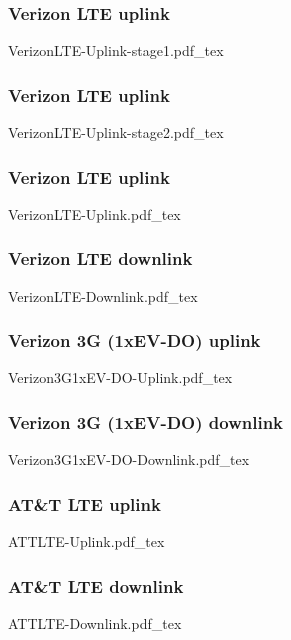\documentclass[svgnames]{beamer}
\begin{document}
\begin{frame}
\frametitle{Verizon LTE uplink}
\vspace{-1 cm}
\def\svgwidth{\columnwidth}\footnotesize{VerizonLTE-Uplink-stage1.pdf_tex}
\end{frame}

\begin{frame}
\frametitle{Verizon LTE uplink}
\vspace{-1 cm}
\def\svgwidth{\columnwidth}\footnotesize{VerizonLTE-Uplink-stage2.pdf_tex}
\end{frame}

\begin{frame}
\frametitle{Verizon LTE uplink}
\vspace{-1 cm}
\def\svgwidth{\columnwidth}\footnotesize{VerizonLTE-Uplink.pdf_tex}
\end{frame}

\begin{frame}
\frametitle{Verizon LTE downlink}
\vspace{-1 cm}
\def\svgwidth{\columnwidth}\footnotesize{VerizonLTE-Downlink.pdf_tex}
\end{frame}

\begin{frame}
\frametitle{Verizon 3G (1xEV-DO) uplink}
\vspace{-1 cm}
\def\svgwidth{\columnwidth}\footnotesize{Verizon3G1xEV-DO-Uplink.pdf_tex}
\end{frame}


\begin{frame}
\frametitle{Verizon 3G (1xEV-DO) downlink}
\vspace{-1 cm}
\def\svgwidth{\columnwidth}\footnotesize{Verizon3G1xEV-DO-Downlink.pdf_tex}
\end{frame}

\begin{frame}
\frametitle{AT\&T LTE  uplink}
\vspace{-1 cm}
\def\svgwidth{\columnwidth}\footnotesize{ATTLTE-Uplink.pdf_tex}
\end{frame}


\begin{frame}
\frametitle{AT\&T LTE downlink}
\vspace{-1 cm}
\def\svgwidth{\columnwidth}\footnotesize{ATTLTE-Downlink.pdf_tex}
\end{frame}
\end{document}
